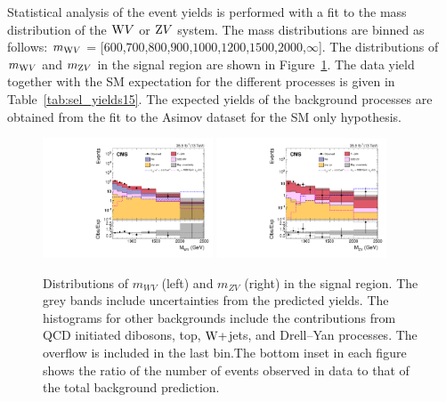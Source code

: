 Statistical analysis of the event yields is performed with a fit to the mass distribution of the $\mathrm{W} V$ or $\mathrm{Z} V$ system. The mass distributions are binned as follows: $m_{\mathrm{W} V}$ = [$600$,$700$,$800$,$900$,$1000$,$1200$,$1500$,$2000$,$\infty$]. The distributions of $m_{\mathrm{W} V}$ and $m_{\mathrm{Z} V}$ in the signal region are shown in Figure~\ref{fig:signal2}. The data yield together with the SM expectation for the different processes is given in Table~\ref{tab:sel_yields15}. The expected yields of the background processes are obtained from the fit to the Asimov dataset for the SM only hypothesis. 


\begin{figure}[!htbp]
\centering
\includegraphics[width=0.45\textwidth]{Plots/plots/wv_signal.pdf}
\includegraphics[width=0.45\textwidth]{Plots/plots/zv_signal.pdf}
\caption{Distributions of $m_{WV}$ (left) and $m_{ZV}$ (right) in the signal region. The grey bands include uncertainties from the predicted yields. The histograms for other backgrounds include the contributions from QCD initiated dibosons, top, $\mathrm{W}+$jets, and Drell--Yan processes. The overflow is included in the last bin.The bottom inset in each figure shows the ratio of the number of events observed in data to that of the total background prediction.}
\label{fig:signal2}
\end{figure}

